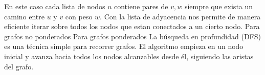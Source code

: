{}
\markdownRendererSectionEnd \markdownRendererSectionBegin
{}\markdownRendererInterblockSeparator
{}En este caso cada lista de nodos $u$ contiene pares de $v,w$ siempre que exista un camino entre $u$ y $v$ con peso $w$.\markdownRendererInterblockSeparator
{}\markdownRendererInterblockSeparator
{}Con la lista de adyacencia nos permite de manera eficiente iterar sobre todos los nodos que estan conectados a un cierto nodo.\markdownRendererParagraphSeparator
{}Para grafos no ponderados\markdownRendererInterblockSeparator
{}\markdownRendererInterblockSeparator
{}Para grafos ponderados\markdownRendererInterblockSeparator
{}\markdownRendererInterblockSeparator
{}
\markdownRendererSectionEnd 
\markdownRendererSectionEnd \markdownRendererSectionBegin
{}\markdownRendererInterblockSeparator
{}
\markdownRendererSectionEnd \markdownRendererSectionBegin
{}\markdownRendererInterblockSeparator
{}\markdownRendererParagraphSeparator
{}
\markdownRendererSectionEnd 
\markdownRendererSectionEnd \markdownRendererSectionBegin
{}\markdownRendererInterblockSeparator
{}\markdownRendererSectionBegin
{}\markdownRendererInterblockSeparator
{}La búsqueda en profundidad (DFS) es una técnica simple para recorrer grafos.\markdownRendererParagraphSeparator
{}El algoritmo empieza en un nodo inicial y avanza hacia todos los nodos alcanzables desde él, siguiendo las aristas del grafo.\markdownRendererParagraphSeparator
{}\markdownRendererSectionBegin
{}\markdownRendererInterblockSeparator
{}\markdownRendererInterblockSeparator
{}
\markdownRendererSectionEnd \markdownRendererSectionBegin
{}\markdownRendererInterblockSeparator
{}\markdownRendererParagraphSeparator
{}
\markdownRendererSectionEnd 
